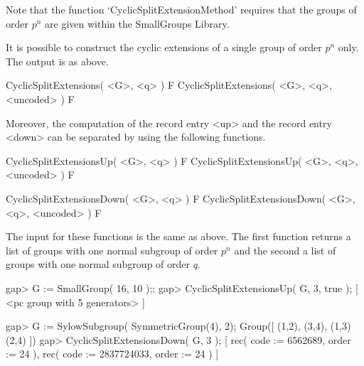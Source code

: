 Note that the function `CyclicSplitExtensionMethod' requires that
the groups of order $p^n$ are given within the SmallGroups Library.


It is possible to construct the cyclic extensions of a single group
of order $p^n$ only. The output is as above.

\>CyclicSplitExtensions( <G>, <q> ) F
\>CyclicSplitExtensions( <G>, <q>, <uncoded> ) F

Moreover, the computation of the record entry <up> and the record
entry <down> can be separated by using the following functions.

\> CyclicSplitExtensionsUp( <G>, <q> ) F
\> CyclicSplitExtensionsUp( <G>, <q>, <uncoded> ) F

\> CyclicSplitExtensionsDown( <G>, <q> ) F
\> CyclicSplitExtensionsDown( <G>, <q>, <uncoded> ) F

The input for these functions is the same as above. The first
function returns a list of groups with one normal subgroup of order
$p^n$ and the second a list of groups with one normal subgroup of order
$q$.

\beginexample
gap> G := SmallGroup( 16, 10 );;
gap> CyclicSplitExtensionsUp( G, 3, true );
[ <pc group with 5 generators> ]

gap> G := SylowSubgroup( SymmetricGroup(4), 2);
Group([ (1,2), (3,4), (1,3)(2,4) ])
gap> CyclicSplitExtensionsDown( G, 3 );
[ rec( code := 6562689, order := 24 ), 
  rec( code := 2837724033, order := 24 ) ]
\endexample
